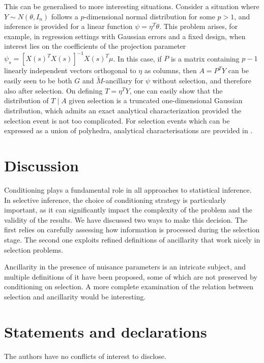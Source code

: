 \documentclass[pdflatex,sn-chicago]{sn-jnl}%
\theoremstyle{thmstyleone}%
\theoremstyle{thmstyletwo}%
\theoremstyle{thmstylethree}%
\begin{document}
This can be generalised to more interesting situations. Consider a situation where $Y\sim N(\theta, I_n)$ follows a $p$-dimensional normal distribution for some $p> 1$, and inference is provided for a linear function $\psi = \eta^T \theta$. This problem arises, for example, in regression settings with Gaussian errors and a fixed design, when interest lies on the coefficients of the projection parameter $\psi_s = [X(s)^TX(s)]^{-1}X(s)^T\mu$. In this case, if $P$ is a matrix containing $p-1$ linearly independent vectors orthogonal to $\eta$ as columns, then $A = P^T Y$ can be easily seen to be both $G$ and $\tilde{M}$-ancillary for $\psi$ without selection, and therefore also after selection. On defining $T = \eta^T Y$, one can easily show that the distribution of $T\mid A$ given selection is a truncated one-dimensional Gaussian distribution, which admits an exact analytical characterization provided the selection event is not too complicated. For selection events which can be expressed as a union of polyhedra, analytical characterisations are provided in \cite{leeetal}.

\section{Discussion}

Conditioning plays a fundamental role in all approaches to statistical inference. In selective inference, the choice of conditioning strategy is particularly important, as it can significantly impact the complexity of the problem and the validity of the results. We have discussed two ways to make this decision. The first relies on carefully assessing how information is processed during the selection stage. The second one exploits refined definitions of ancillarity that work nicely in selection problems.

Ancillarity in the presence of nuisance parameters is an intricate subject, and multiple definitions of it have been proposed, some of which are not preserved by conditioning on selection. A more complete examination of the relation between selection and ancillarity would be interesting.

\backmatter


\section*{Statements and declarations}

The authors have no conflicts of interest to disclose.


\end{document}
